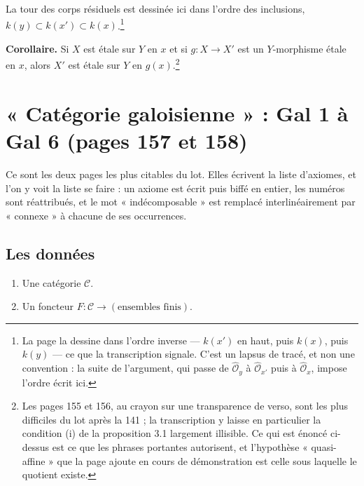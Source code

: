 \documentclass[11pt,a4paper]{article}
\begin{document}
\qquad
{}

La tour des corps résiduels est dessinée ici dans l'ordre des inclusions,
$k(y) \subset k(x') \subset k(x)$.\footnote{La page la dessine dans l'ordre
inverse --- $k(x')$ en haut, puis $k(x)$, puis $k(y)$ --- ce que la
transcription signale. C'est un lapsus de tracé, et non une convention : la
suite de l'argument, qui passe de $\hat{\mathcal{O}}_{y}$ à
$\hat{\mathcal{O}}_{x'}$ puis à $\hat{\mathcal{O}}_{x}$, impose l'ordre écrit
ici.}

\textbf{Corollaire.} Si $X$ est étale sur $Y$ en $x$ et si $g : X \to X'$ est
un $Y$-morphisme étale en $x$, alors $X'$ est étale sur $Y$ en
$g(x)$.\footnote{Les pages 155 et 156, au crayon sur une transparence de
verso, sont les plus difficiles du lot après la 141 ; la transcription y laisse
en particulier la condition (i) de la proposition 3.1 largement illisible. Ce
qui est énoncé ci-dessus est ce que les phrases portantes autorisent, et
l'hypothèse « quasi-affine » que la page ajoute en cours de démonstration est
celle sous laquelle le quotient existe.}

\section*{« Catégorie galoisienne » : Gal 1 à Gal 6 (pages 157 et 158)}

Ce sont les deux pages les plus citables du lot. Elles écrivent la liste
d'axiomes, et l'on y voit la liste se faire : un axiome est écrit puis biffé en
entier, les numéros sont réattribués, et le mot « indécomposable » est remplacé
interlinéairement par « connexe » à chacune de ses occurrences.

\subsection*{Les données}

\begin{enumerate}
  \item[(i)] Une catégorie $\mathcal{C}$.
  \item[(ii)] Un foncteur $F : \mathcal{C} \to (\text{ensembles finis})$.
\end{enumerate}
\end{document}
